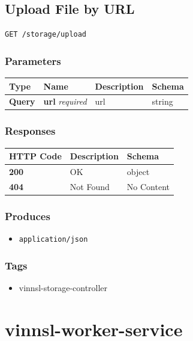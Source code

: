 \subsection{Upload File by URL}\label{upload-file-by-url}

\begin{verbatim}
GET /storage/upload
\end{verbatim}

\subsubsection{Parameters}\label{parameters-18}

\begin{longtable}[]{@{}llll@{}}
\toprule
Type & Name & Description & Schema\tabularnewline
\midrule
\endhead
\textbf{Query} & \textbf{url} \emph{required} & url &
string\tabularnewline
\bottomrule
\end{longtable}

\subsubsection{Responses}\label{responses-22}

\begin{longtable}[]{@{}lll@{}}
\toprule
HTTP Code & Description & Schema\tabularnewline
\midrule
\endhead
\textbf{200} & OK & object\tabularnewline
\textbf{404} & Not Found & No Content\tabularnewline
\bottomrule
\end{longtable}

\subsubsection{Produces}\label{produces-22}

\begin{itemize}
\tightlist
\item
  \texttt{application/json}
\end{itemize}

\subsubsection{Tags}\label{tags-22}

\begin{itemize}
\tightlist
\item
  vinnsl-storage-controller
\end{itemize}

\section{vinnsl-worker-service}\label{vinnsl-worker-service-1}

